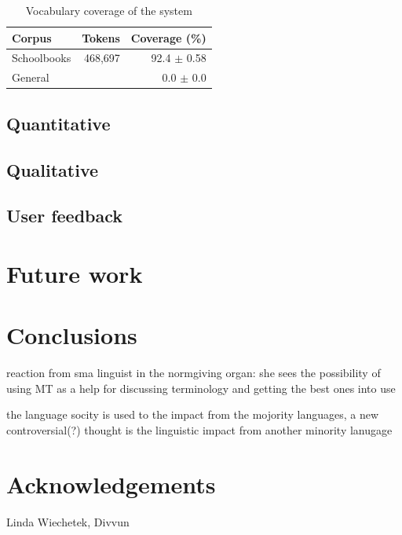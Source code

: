 \documentclass[a4paper,11pt,twocolumn]{article}
\begin{document}
\begin{table}
  \begin{center}
    \begin{tabular}{|l|r|r|}
      \hline
      \textbf{Corpus} & \textbf{Tokens} & \textbf{Coverage (\%)}  \\
      \hline
      Schoolbooks     & 468,697 & 92.4 $\pm$ 0.58 \\
      General         & & 0.0 $\pm$ 0.0 \\
      \hline
    \end{tabular}
    \label{table:coverage}
    \caption{Vocabulary coverage of the system}
  \end{center}
\end{table}

\subsection{Quantitative}
\subsection{Qualitative}

\subsection{User feedback}

\section{Future work}
\section{Conclusions}

 reaction from sma linguist in the normgiving organ: she sees the possibility of using MT as a help for discussing terminology and getting the best ones into use

 the language socity is used to the impact from the mojority languages, a new controversial(?) thought is the linguistic impact from another minority lanugage 


\section*{Acknowledgements}

Linda Wiechetek, Divvun



\end{document}
